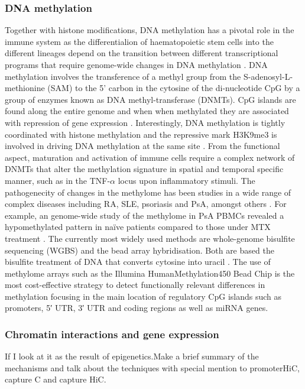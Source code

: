 \subsubsection{DNA methylation}
Together with histone modifications, DNA methylation has a pivotal role in the immune system as the differentialion of haematopoietic stem cells into the different lineages depend on the transition between different transcriptional programs that require genome-wide changes in DNA methylation \parencite{Sellars2015,Lai2013}. DNA methylation involves the transference of a methyl group from the S-adenosyl-L-methionine (SAM) to the 5' carbon in the cytosine of the di-nucleotide CpG by a group of enzymes known as DNA methyl-transferase (DNMTs). CpG islands are found along the entire genome and when when methylated they are associated with repression of gene expression \parencite{Herman2003}. Interestingly, DNA methylation is tightly coordinated with histone methylation and the repressive mark H3K9me3 is involved in driving DNA methylation at the same site \parencite{Rottach2009}. From the functional aspect, maturation and activation of immune cells require a complex network of DNMTs that alter the methylation signature in spatial and temporal specific manner, such as in the TNF-$\alpha$ locus upon inflammatory stimuli\parencite{Sullivan2007}. The pathogenecity of changes in the methylome has been studies in a wide range of complex diseases including RA, SLE, psoriasis and PsA, amongst others \parencite{Lei2009,Liu2013,Zhang2010}. For example, an genome-wide study of the methylome in PsA PBMCs revealed a hypomethylated pattern in na\"{i}ve patients compared to those under MTX treatment \parencite{Kim1996}.
The currently most widely used methods are whole-genome bisulfite sequencing (WGBS) and the bead array hybridisation. Both are based the bisulfite treatment of DNA that converts cytosine into uracil \parencite{Frommer1992,Miura2014,Dedeurwaerder2013}. The use of methylome arrays such as the Illumina HumanMethylation450 Bead Chip is the most cost-effective strategy to detect functionally relevant differences in methylation focusing in the main location of regulatory CpG islands such as promoters, 5′ UTR, 3′ UTR and coding regions as well as miRNA genes.

\subsubsection{Chromatin interactions and gene expression}
If I look at it as the result of epigenetics.Make a brief summary of the mechanisms and talk about the techniques with special mention to promoterHiC, capture C and capture HiC.

